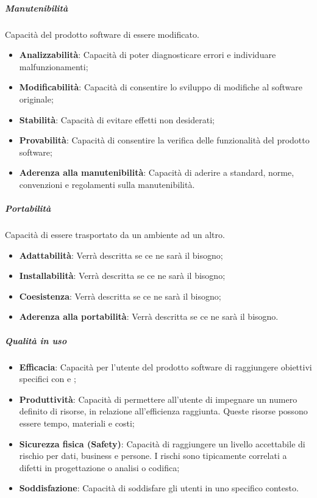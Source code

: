 \subparagraph{Manutenibilità}
Capacità del prodotto software di essere modificato.
\begin{itemize}
\item \textbf{Analizzabilità}: Capacità di poter diagnosticare errori e individuare malfunzionamenti;
\item \textbf{Modificabilità}: Capacità di consentire lo sviluppo di modifiche al software originale;
\item \textbf{Stabilità}: Capacità di evitare effetti non desiderati;
\item \textbf{Provabilità}: Capacità di consentire la verifica delle funzionalità del prodotto software;
\item \textbf{Aderenza alla manutenibilità}: Capacità di aderire a standard, norme, convenzioni e regolamenti sulla manutenibilità.
\end{itemize}

\subparagraph{Portabilità}
Capacità di essere trasportato da un ambiente ad un altro.
\begin{itemize}
\item \textbf{Adattabilità}: Verrà descritta se ce ne sarà il bisogno;
\item \textbf{Installabilità}: Verrà descritta se ce ne sarà il bisogno;
\item \textbf{Coesistenza}: Verrà descritta se ce ne sarà il bisogno;
\item \textbf{Aderenza alla portabilità}: Verrà descritta se ce ne sarà il bisogno.
\end{itemize}

\subparagraph{Qualità in uso}
\begin{itemize}
\item \textbf{Efficacia}: Capacità per l’utente del prodotto software di raggiungere obiettivi specifici con  e ;
\item \textbf{Produttività}: Capacità di permettere all’utente di impegnare un numero definito di risorse, in relazione all’efficienza raggiunta. Queste risorse possono essere tempo, materiali e costi;
\item \textbf{Sicurezza fisica (Safety)}: Capacità di raggiungere un livello accettabile di rischio per dati, business e persone. I rischi sono tipicamente correlati a difetti in progettazione o analisi o codifica;
\item \textbf{Soddisfazione}: Capacità di soddisfare gli utenti in uno specifico contesto.
\end{itemize}